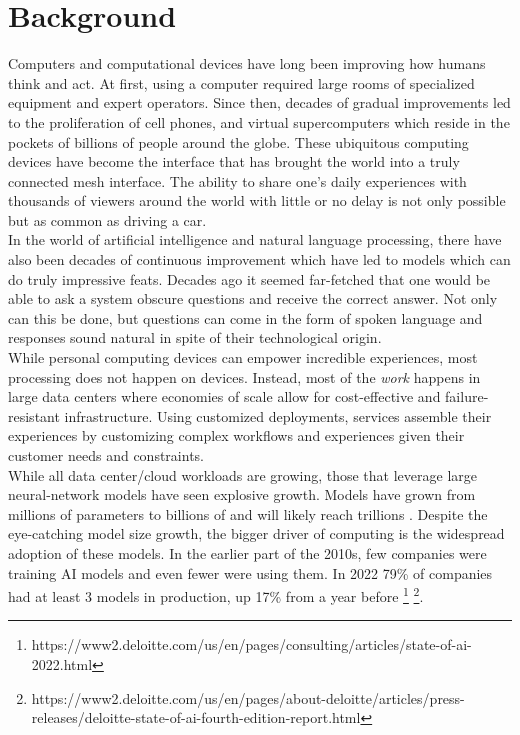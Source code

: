 \section{Background}
Computers and computational devices have long been improving how humans think and act. At first, using a computer required large rooms of specialized equipment and expert operators. Since then, decades of gradual improvements led to the proliferation of cell phones, and virtual supercomputers which reside in the pockets of billions of people around the globe. These ubiquitous computing devices have become the interface that has brought the world into a truly connected mesh interface. The ability to share one's daily experiences with thousands of viewers around the world with little or no delay is not only possible but as common as driving a car. \\
In the world of artificial intelligence and natural language processing, there have also been decades of continuous improvement which have led to models which can do truly impressive feats. Decades ago it seemed far-fetched that one would be able to ask a system obscure questions and receive the correct answer. Not only can this be done, but questions can come in the form of spoken language and responses sound natural in spite of their technological origin. \\
While personal computing devices can empower incredible experiences, most processing does not happen on devices. Instead, most of the \textit{work} happens in large data centers where economies of scale allow for cost-effective and failure-resistant infrastructure. Using customized deployments, services assemble their experiences by customizing complex workflows and experiences given their customer needs and constraints. \\
While all data center/cloud workloads are growing, those that leverage large neural-network models have seen explosive growth. Models have grown from millions of parameters \cite{Krizhevsky2012ImageNetCW} to billions of \cite{Brown2020LanguageMA} and will likely reach trillions \cite{Fedus2021SwitchTS}. Despite the eye-catching model size growth, the bigger driver of computing is the widespread adoption of these models. In the earlier part of the 2010s, few companies were training AI models and even fewer were using them. In 2022 79\% of companies had at least 3 models in production, up 17\% from a year before \footnote{https://www2.deloitte.com/us/en/pages/consulting/articles/state-of-ai-2022.html} \footnote{https://www2.deloitte.com/us/en/pages/about-deloitte/articles/press-releases/deloitte-state-of-ai-fourth-edition-report.html}. \\
